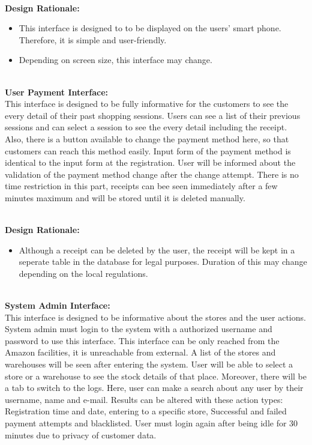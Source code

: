 \documentclass[11pt]{article}
\begin{document}
    \textbf{\\Design Rationale:}
    \begin{itemize}
       \item This interface is designed to to be displayed on the users' smart phone. Therefore, it is simple and user-friendly.
       \item Depending on screen size, this interface may change. 
    \end{itemize}

    \textbf{\\User Payment Interface:\\}
    This interface is designed to be fully informative for
    the customers to see the every detail of their past shopping sessions. Users can see a
    list of their previous sessions and can select a session to see the every detail including
    the receipt. Also, there is a button available to change the payment method here,
    so that customers can reach this method easily. Input form of the payment method
    is identical to the input form at the registration. User will be informed about the
    validation of the payment method change after the change attempt. There is no
    time restriction in this part, receipts can bee seen immediately after a few minutes
    maximum and will be stored until it is deleted manually.
    
    \textbf{\\Design Rationale:}
    \begin{itemize}
       \item Although a receipt can be deleted by the user, the receipt will be kept in a seperate table in the database for legal purposes.
       Duration of this may change depending on the local regulations.
    \end{itemize}

    \textbf{\\System Admin Interface:\\}
    This interface is designed to be informative about
    the stores and the user actions. System admin must login to the system with a
    authorized username and password to use this interface. This interface can be only
    reached from the Amazon facilities, it is unreachable from external. A list of the
    stores and warehouses will be seen after entering the system. User will be able
    to select a store or a warehouse to see the stock details of that place. Moreover,
    there will be a tab to switch to the logs. Here, user can make a search about any
    user by their username, name and e-mail. Results can be altered with these action
    types: Registration time and date, entering to a specific store, Successful and failed
    payment attempts and blacklisted. User must login again after being idle for 30
    minutes due to privacy of customer data. 
    
\end{document}
